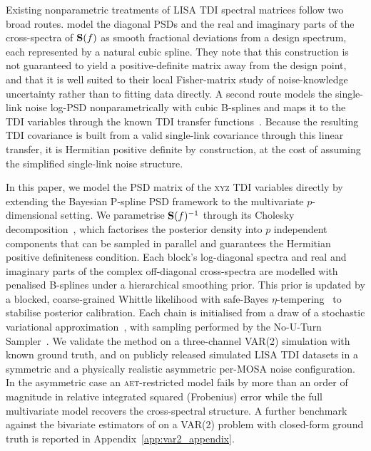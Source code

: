 \documentclass[%
	reprint,
	nofootinbib,
	amsmath,
	amssymb,
	aps,
]{revtex4-2}
\renewcommand{\S}{{\bf S}}
\newcommand{\AET}{\textsc{aet}\xspace}
\newcommand{\XYZ}{\textsc{xyz}\xspace}
\begin{document}
    Existing nonparametric treatments of LISA TDI spectral matrices follow two
    broad routes. \citet{muratore_impact_2023} model the diagonal PSDs and the
    real and imaginary parts of the cross-spectra of $\S(f)$ as smooth
    fractional deviations from a design spectrum, each represented by a natural
    cubic spline. They note that this construction is not guaranteed to yield a
    positive-definite matrix away from the design point, and that it is well
    suited to their local Fisher-matrix study of noise-knowledge uncertainty
    rather than to fitting data directly. A second route models the single-link
    noise log-PSD nonparametrically with cubic B-splines and maps it to the TDI
    variables through the known TDI transfer functions~\citep{baghi_uncovering_2023}.
    Because the resulting TDI covariance is built from a valid single-link
    covariance through this linear transfer, it is Hermitian positive definite
    by construction, at the cost of assuming the simplified single-link noise
    structure.
     
    In this paper, we model the PSD matrix of the \XYZ TDI variables directly by extending the Bayesian P-spline PSD framework
    \citep{maturana-russel_bayesian_2021} to the multivariate $p$-dimensional
    setting. We parametrise $\S(f)^{-1}$ through its Cholesky
    decomposition~\citep{RosenOri2007Aeom, Hu2023}, which factorises the
    posterior density into $p$ independent components that can be
    sampled in parallel and guarantees the Hermitian positive definiteness
    condition.
    Each block's log-diagonal spectra and real and imaginary parts of the complex
    off-diagonal cross-spectra are modelled with penalised B-splines under a
    hierarchical smoothing prior.
    This prior is updated by a blocked, coarse-grained Whittle likelihood
    with safe-Bayes $\eta$-tempering~\citep{grunwald2019} to stabilise
    posterior calibration. Each chain is initialised from a draw of a
    stochastic variational approximation~\citep{hoffman2013_SVI}, with
    sampling performed by the No-U-Turn Sampler~\citep{hoffman2014_NUTS}.
    We validate the method on a three-channel VAR(2) simulation with known
    ground truth, and on publicly released simulated LISA TDI datasets in a
    symmetric and a physically realistic asymmetric per-MOSA noise configuration. In the
    asymmetric case an \AET-restricted model fails by more than an order of magnitude in
    relative integrated squared (Frobenius) error while the full multivariate model
    recovers the cross-spectral structure. A further benchmark against the
    bivariate estimators of \citet{yixuan_vnpc} on a VAR(2) problem with
    closed-form ground truth is reported in Appendix~\ref{app:var2_appendix}.
     
\end{document}
